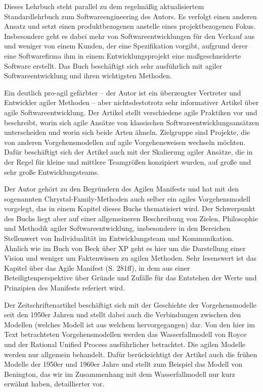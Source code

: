 {Dieses Lehrbuch steht parallel zu dem regelmäßig aktualisiertem Standardlehrbuch zum Softwareengineering  \cite{som18} des Autors. Es verfolgt einen anderen Ansatz und setzt einen produktbezogenen anstelle eines projektbezogenen Fokus. Insbesondere geht es dabei mehr von Softwareentwicklungen für den Verkauf aus und weniger von einem Kunden, der eine Spezifikation vorgibt, aufgrund derer eine Softwarefirma ihm in einem Entwicklungsprojekt eine maßgeschneiderte Software erstellt. Das Buch beschäftigt sich sehr ausführlich mit agiler Softwareentwicklung und ihren wichtigsten Methoden.}

{Ein deutlich pro-agil gefärbter – der Autor ist ein überzeugter Vertreter und Entwickler agiler Methoden – aber nichtsdestotrotz sehr informativer Artikel über agile Softwareentwicklung. Der Artikel stellt verschiedene agile Praktiken vor und beschreibt, worin sich agile Ansätze von klassischen Softwareentwicklungsansätzen unterscheiden und worin sich beide Arten ähneln. Zielgruppe sind Projekte, die von anderen Vorgehensmodellen auf agile Vorgehensweisen wechseln möchten. Dafür beschäftigt sich der Artikel auch mit der Skalierung agiler Ansätze, die in der Regel für kleine und mittlere Teamgrößen konzipiert wurden, auf große und sehr große Entwicklungsteams.}

{Der Autor gehört zu den Begründern des Agilen Manifests und hat mit den sogenannten Chrystal-Family-Methoden auch selber ein agiles Vorgehensmodell vorgelegt, das in einem Kapitel dieses Buchs thematisiert wird. Der Schwerpunkt des Buchs liegt aber auf einer allgemeineren Beschreibung von Zielen, Philosophie und Methodik agiler Softwareentwicklung, insbesondere in den Bereichen Stellenwert von Individualität im Entwicklungsteam und Kommunikation. Ähnlich wie im Buch von Beck über XP \cite{bec03} geht es hier um die Darstellung einer Vision und weniger um Faktenwissen zu agilen Methoden. Sehr lesenswert ist das Kapitel über das Agile Manifest (S. 281ff), in dem aus einer Beteiligtenperspektive über Gründe und Zufälle für das Entstehen der Werte und Prinzipien des Manifests referiert wird.}

{Der Zeitschriftenartikel beschäftigt sich mit der Geschichte der Vorgehensmodelle seit den 1950er Jahren und stellt dabei auch die Verbindungen zwischen den Modellen (welches Modell ist aus welchem hervorgegangen) dar. Von den hier im Text betrachteten Vorgehensmodellen werden das Wasserfallmodell von Royce und der Rational Unified Process ausführlicher betrachtet. Die agilen Modelle werden nur allgemein behandelt. Dafür berücksichtigt der Artikel auch die frühen Modelle der 1950er und 1960er Jahre und stellt zum Beispiel das Modell von Benington, das wir im Zusammenhang mit dem Wasserfallmodell nur kurz erwähnt haben, detaillierter vor.}

